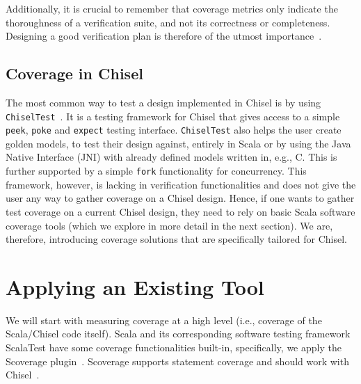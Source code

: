 \documentclass[conference]{IEEEtran}
\newcommand{\martin}[1]{{\color{blue} Martin: #1}}
\begin{document}
Additionally, it is crucial to remember that coverage metrics only indicate the thoroughness of a verification suite, and not its correctness or completeness. Designing a good verification plan is therefore of the utmost importance~\cite{hdlverify}. %

\subsection{Coverage in Chisel} 
The most common way to test a design implemented in Chisel is by using \texttt{ChiselTest}~\cite{chisel:tester2}. 
It is a testing framework for Chisel that gives access to a simple \texttt{peek}, \texttt{poke} and \texttt{expect} testing interface. 
\texttt{ChiselTest} also helps the user create golden models, to test their design against, entirely in Scala or by using the Java Native Interface (JNI) with already defined models written in, e.g., C. This is further supported by a simple \texttt{fork} functionality for concurrency.  
This framework, however, is lacking in verification functionalities and does not give the user any way to gather coverage on a Chisel design.
Hence, if one wants to gather test coverage on a current Chisel design, they need to rely on basic Scala software coverage tools (which we explore in more detail in the next section). 
We are, therefore, introducing coverage solutions that are specifically tailored for Chisel.

\section{Applying an Existing Tool}
We will start with measuring coverage at a high level (i.e., coverage of the Scala/Chisel code itself). Scala and its corresponding software testing framework ScalaTest have some coverage functionalities built-in, specifically, we apply the Scoverage plugin~\cite{scoverage}. Scoverage supports statement coverage and should work with Chisel~\cite{chisel:scoverage}.

\end{document}
